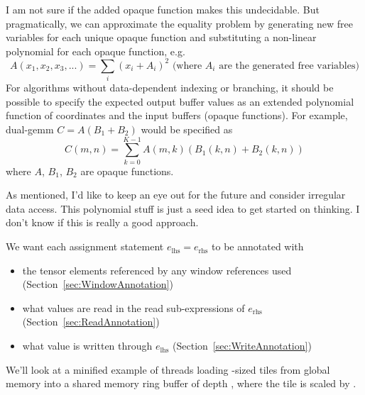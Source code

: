 I am not sure if the added opaque function makes this undecidable.
But pragmatically, we can approximate the equality problem by generating new free variables for each unique opaque function and substituting a non-linear polynomial for each opaque function, e.g.
\begin{equation*}
    A(x_1, x_2, x_3, ...) = \sum_{i} (x_i + A_i)^2 \text{  (where $A_i$ are the generated free variables)}
\end{equation*}
For algorithms without data-dependent indexing or branching, it should be possible to specify the expected output buffer values as an extended polynomial function of coordinates and the input buffers (opaque functions).
For example, dual-gemm $C = A(B_1 + B_2)$ would be specified as
\begin{equation*}
    C(m, n) = \sum_{k=0}^{K-1} A(m, k)(B_1(k, n) + B_2(k, n))
\end{equation*}
where $A$, $B_1$, $B_2$ are opaque functions.

As mentioned, I'd like to keep an eye out for the future and consider irregular data access.
This polynomial stuff is just a seed idea to get started on thinking.
I don't know if this is really a good approach.


We want each assignment statement $e_\mathrm{lhs} = e_\mathrm{rhs}$ to be annotated with

\begin{itemize}
    \item the tensor elements referenced by any window references used (Section~\ref{sec:WindowAnnotation})
    \item what values are read in the read sub-expressions of $e_\mathrm{rhs}$ (Section~\ref{sec:ReadAnnotation})
    \item what value is written through $e_\mathrm{lhs}$ (Section~\ref{sec:WriteAnnotation})
\end{itemize}

We'll look at a minified example of threads loading -sized tiles from global memory into a shared memory ring buffer of depth , where the tile is scaled by .

